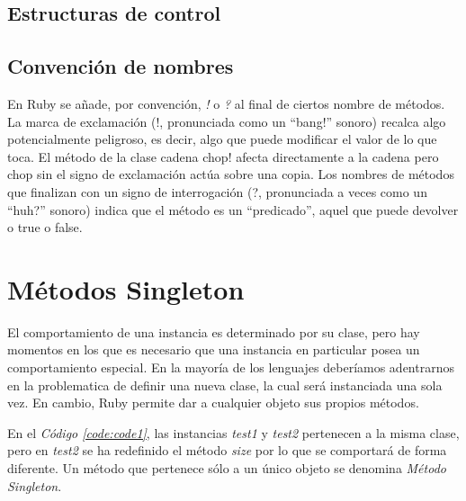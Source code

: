 \documentclass{article}
\newcommand{\refcode}[1]{\textit{Código \ref{#1}}}
\begin{document}
 
\bigskip


\subsection{Estructuras de control}


\bigskip


\subsection{Convención de nombres}

En Ruby se añade, por convención, \textit{!} o \textit{?} al final de ciertos nombre de métodos.  La marca de exclamación (!, pronunciada como un “bang!” sonoro)  recalca algo potencialmente peligroso, es decir, algo que puede modificar el valor de lo que toca. El método de la clase cadena chop! afecta directamente a la cadena pero chop sin el signo de exclamación actúa sobre una copia.
Los nombres de métodos que finalizan con un signo de interrogación (?, pronunciada a veces como un “huh?” sonoro) indica que el método es un “predicado”, aquel que puede devolver o true o false.




\section{Métodos Singleton}

	El comportamiento de una instancia es determinado por su clase, pero hay momentos en los que es necesario que una instancia en particular posea un comportamiento especial. En la mayoría de los lenguajes deberíamos adentrarnos en la problematica de definir una nueva clase, la cual será instanciada una sola vez. En cambio, Ruby permite dar a cualquier objeto sus propios métodos.

 
\bigskip

	En el \refcode{code:code1}, las instancias \textit{test1} y \textit{test2} pertenecen a la misma clase, pero en \textit{test2} se ha redefinido el método \textit{size} por lo que se comportará de forma diferente. Un método que pertenece sólo a un único objeto se denomina \textit{Método Singleton}.
\end{document}
